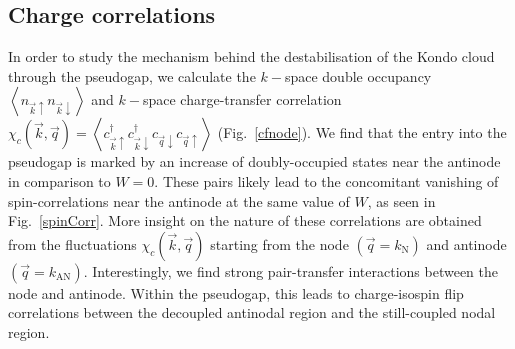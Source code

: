 \documentclass[reprint,hidelinks]{revtex4-2}
\begin{document}
\subsection{Charge correlations}
In order to study the mechanism behind the destabilisation of the Kondo cloud through the pseudogap, we calculate the \(k-\)space double occupancy \(\left<n_{\vec k \uparrow} n_{\vec k \downarrow}\right>\) and \(k-\)space charge-transfer correlation \(\chi_c(\vec k, \vec q) = \left<c^\dagger_{\vec k \uparrow} c^\dagger_{\vec k \downarrow} c_{\vec q \downarrow}c_{\vec q \uparrow}\right>\) (Fig.~\ref{cfnode}). We find that the entry into the pseudogap is marked by an increase of doubly-occupied states near the antinode in comparison to \(W=0\). These pairs likely lead to the concomitant vanishing of spin-correlations near the antinode at the same value of \(W\), as seen in Fig.~\ref{spinCorr}. More insight on the nature of these correlations are obtained from the fluctuations \(\chi_c(\vec k, \vec q)\) starting from the node \((\vec q = k_\text{N})\) and antinode \(\left( \vec q = k_\text{AN}\right) \). Interestingly, we find strong pair-transfer interactions between the node and antinode. Within the pseudogap, this leads to charge-isospin flip correlations between the decoupled antinodal region and the still-coupled nodal region.
\end{document}
